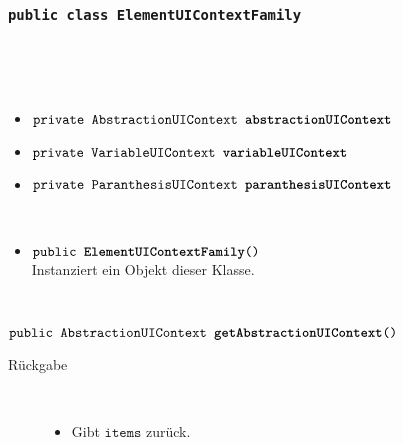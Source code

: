 	\subsubsection{\normalfont \texttt{public class \textbf{ElementUIContextFamily}}}

\begin{description}
\item[Beschreibung] \hfill \\ 
\item[Attribute] \hfill \\
	\vspace{-.8cm}
	\begin{itemize}	
		\item $\texttt{private AbstractionUIContext \textbf{abstractionUIContext}}$ \\ 		
		\item $\texttt{private VariableUIContext \textbf{variableUIContext}}$ \\ 
		\item $\texttt{private ParanthesisUIContext \textbf{paranthesisUIContext}}$ \\ 
		\end{itemize}
	
\item[Konstruktoren] \hfill \\
	\vspace{-.8cm}
	\begin{itemize}
		\item $\texttt{public \textbf{ElementUIContextFamily}()}$ \\ Instanziert ein Objekt dieser Klasse.

	\end{itemize}
	
\item[Methoden] \hfill \\
	\vspace{-.8cm}
		\item $\texttt{public AbstractionUIContext \textbf{getAbstractionUIContext}()}$ \\ 
		\begin{description}
			\item[Rückgabe] \hfill \\
			\vspace{-.8cm}
			\begin{itemize}
				\item Gibt $\texttt{items}$ zurück.
			\end{itemize}
			\end{description}
			

\end{description}
